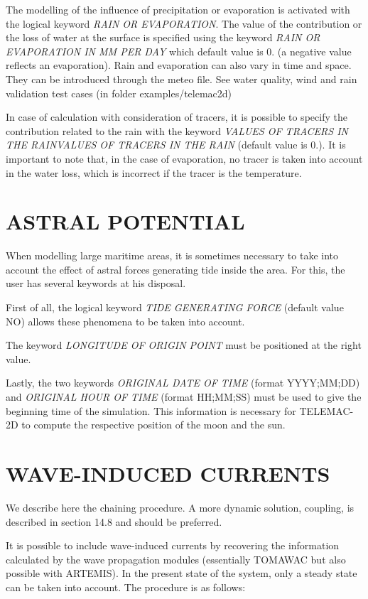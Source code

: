  The modelling of the influence of precipitation or evaporation is activated with the logical keyword \textit{RAIN OR EVAPORATION}. The value of the contribution or the loss of water at the surface is specified using the keyword \textit{RAIN OR EVAPORATION IN MM PER DAY} which default value is 0. (a negative value reflects an evaporation). Rain and evaporation can also vary in time and space. They can be introduced through the meteo file. See water quality, wind and rain validation test cases (in folder examples/telemac2d)

 In case of calculation with consideration of tracers, it is possible to specify the contribution related to the rain with the keyword \textit{VALUES OF TRACERS IN THE RAINVALUES OF TRACERS IN THE RAIN} (default value is 0.). It is important to note that, in the case of evaporation, no tracer is taken into account in the water loss, which is incorrect if the tracer is the temperature.


\section{ ASTRAL POTENTIAL}

 When modelling large maritime areas, it is sometimes necessary to take into account the effect of astral forces generating tide inside the area. For this, the user has several keywords at his disposal.

 First of all, the logical keyword \textit{TIDE GENERATING FORCE} (default value NO) allows these phenomena to be taken into account.

 The keyword \textit{LONGITUDE OF ORIGIN POINT}  must be positioned at the right value.

 Lastly, the two keywords \textit{ORIGINAL DATE OF TIME} (format YYYY;MM;DD) and \textit{ORIGINAL HOUR OF TIME}  (format HH;MM;SS) must be used to give the beginning time of the simulation. This information is necessary for TELEMAC-2D to compute the respective position of the moon and the sun.


\section{ WAVE-INDUCED CURRENTS}

 We describe here the chaining procedure.  A more dynamic solution, coupling, is described in section 14.8 and should be preferred.

 It is possible to include wave-induced currents by recovering the information calculated by the wave propagation modules (essentially TOMAWAC but also possible with ARTEMIS). In the present state of the system, only a steady state can be taken into account. The procedure is as follows:

